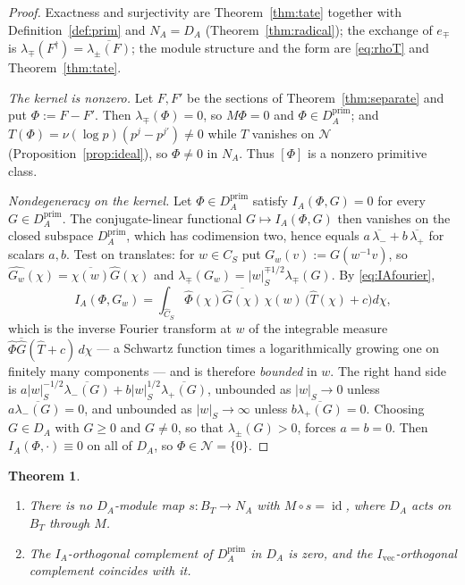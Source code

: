 \documentclass[11pt]{amsart}
\newtheorem{theorem}{Theorem}[section]
\theoremstyle{definition}
\theoremstyle{remark}
\newcommand{\id}{\operatorname{id}}
\newcommand{\Th}{\widehat{T}}
\newcommand{\Ch}{\widehat{C}_S}
\newcommand{\DA}{D_A}
\newcommand{\Nrad}{\mathcal N}
\newcommand{\BT}{B_T}
\begin{document}
\begin{proof}
Exactness and surjectivity are Theorem~\ref{thm:tate} together with
Definition~\ref{def:prim} and $N_A=\DA$ (Theorem~\ref{thm:radical}); the
exchange of $e_{\mp}$ is $\lambda_{\mp}(F^{\dagger})=\overline{\lambda_{\pm}(F)}$;
the module structure and the form are \eqref{eq:rhoT} and
Theorem~\ref{thm:tate}.

\emph{The kernel is nonzero.}  Let $F,F'$ be the sections of
Theorem~\ref{thm:separate} and put $\Phi:=F-F'$.  Then $\lambda_{\mp}(\Phi)=0$,
so $M\Phi=0$ and $\Phi\in\DA^{\mathrm{prim}}$; and
$T(\Phi)=\nu(\log p)(p^{j}-p^{j'})\ne0$ while $T$ vanishes on $\Nrad$
(Proposition~\ref{prop:ideal}), so $\Phi\ne0$ in $N_A$.  Thus $[\Phi]$ is a
nonzero primitive class.

\emph{Nondegeneracy on the kernel.}  Let $\Phi\in\DA^{\mathrm{prim}}$ satisfy
$I_A(\Phi,G)=0$ for every $G\in\DA^{\mathrm{prim}}$.  The conjugate-linear
functional $G\mapsto I_A(\Phi,G)$ then vanishes on the closed subspace
$\DA^{\mathrm{prim}}$, which has codimension two, hence equals
$a\,\overline{\lambda_-}+b\,\overline{\lambda_+}$ for scalars $a,b$.  Test on
translates: for $w\in C_S$ put $G_w(v):=G(w^{-1}v)$, so
$\widehat{G_w}(\chi)=\overline{\chi(w)}\widehat G(\chi)$ and
$\lambda_{\mp}(G_w)=|w|_S^{\mp1/2}\lambda_{\mp}(G)$.  By
\eqref{eq:IAfourier},
\[
I_A(\Phi,G_w)=\int_{\Ch}\widehat\Phi(\chi)\overline{\widehat G(\chi)}\,
\chi(w)\,\bigl(\Th(\chi)+c\bigr)d\chi ,
\]
which is the inverse Fourier transform at $w$ of the integrable measure
$\widehat\Phi\overline{\widehat G}(\Th+c)\,d\chi$ --- a Schwartz function
times a logarithmically growing one on finitely many components --- and is
therefore \emph{bounded} in $w$.  The right hand side is
$a|w|_S^{-1/2}\overline{\lambda_-(G)}+b|w|_S^{1/2}\overline{\lambda_+(G)}$,
unbounded as $|w|_S\to0$ unless $a\overline{\lambda_-(G)}=0$, and unbounded as
$|w|_S\to\infty$ unless $b\overline{\lambda_+(G)}=0$.  Choosing $G\in\DA$ with
$G\ge0$ and $G\ne0$, so that $\lambda_{\pm}(G)>0$, forces $a=b=0$.  Then
$I_A(\Phi,\cdot)\equiv0$ on all of $\DA$, so $\Phi\in\Nrad=\{0\}$.
\end{proof}

\begin{theorem}\label{thm:nosplit}
\begin{enumerate}
\item[(a)] There is no $\DA$-module map $s:\BT\to N_A$ with $M\circ s=\id$,
where $\DA$ acts on $\BT$ through $M$.
\item[(b)] The $I_A$-orthogonal complement of $\DA^{\mathrm{prim}}$ in $\DA$ is
zero, and the $I_{\mathrm{vec}}$-orthogonal complement coincides with it.
\end{enumerate}
\end{theorem}
\end{document}
